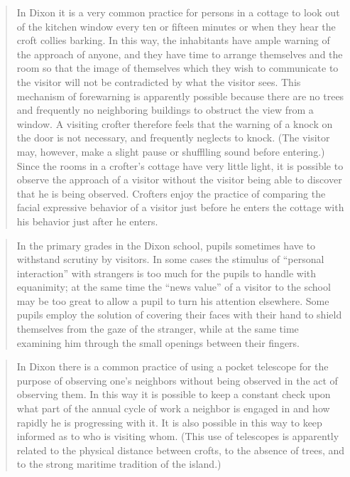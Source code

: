 \documentclass[openany,nobib]{tufte-book}
\begin{document}
\begin{quote}
In Dixon it is a very common practice for persons in a cottage to look
out of the kitchen window every ten or fifteen minutes or when they hear
the croft collies barking. In this way, the inhabitants have ample
warning of the approach of anyone, and they have time to arrange
themselves and the room so that the image of themselves which they wish
to communicate to the visitor will not be contradicted by what the
visitor sees. This mechanism of forewarning is apparently possible
because there are no trees and frequently no neighboring buildings to
obstruct the view from a window. A visiting crofter therefore feels that
the warning of a knock on the door is not necessary, and frequently
neglects to knock. (The visitor may, however, make a slight pause or
shufflling sound before entering.) Since the rooms in a crofter's
cottage have very little light, it is possible to observe the approach
of a visitor without the visitor being able to discover that he is being
observed. Crofters enjoy the practice of comparing the facial expressive
behavior of a visitor just before he enters the cottage with his
behavior just after he enters.
\end{quote}

\begin{quote}
In the primary grades in the Dixon school, pupils some­times have to
withstand scrutiny by visitors. In some cases the stimulus of ``personal
interaction'' with strangers is too much for the pupils to handle with
equanimity; at the same time the ``news value'' of a visitor to the
school may be too great to allow a pupil to turn his attention
elsewhere. Some pupils em­ploy the solution of covering their faces with
their hand to shield themselves from the gaze of the stranger, while at
the same time examining him through the small openings between their
fingers.
\end{quote}

\begin{quote}
In Dixon there is a common practice of using a pocket telescope for the
purpose of observing one's neighbors without being observed in the act
of observing them. In this way it is possible to keep a constant check
upon what part of the annual cycle of work a neighbor is engaged in and
how rapidly he is progressing with it. It is also possible in this way
to keep informed as to who is visiting whom. (This use of telescopes is
apparently related to the physical distance between crofts, to the
absence of trees, and to the strong maritime tradition of the island.)
\end{quote}
\end{document}
